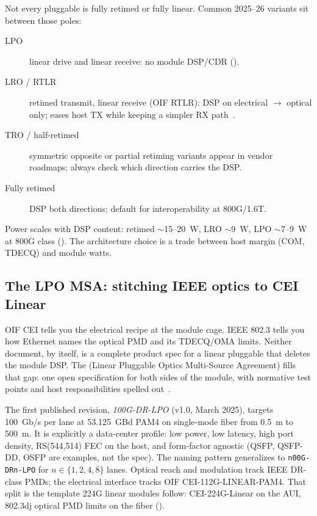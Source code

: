 Not every pluggable is fully retimed or fully linear. Common 2025--26 variants
sit between those poles:

\begin{description}
\item[LPO] linear drive and linear receive: no module DSP/CDR
      ().
\item[LRO / RTLR] retimed transmit, linear receive (OIF RTLR): DSP on electrical
      $\to$ optical only; eases host TX while keeping a simpler RX path~\cite{lpo}.
\item[TRO / half-retimed] symmetric opposite or partial retiming variants appear in
      vendor roadmaps; always check which direction carries the DSP.
\item[Fully retimed] DSP both directions; default for interoperability at 800G/1.6T.
\end{description}

Power scales with DSP content: retimed $\sim$15--20~W, LRO $\sim$9~W, LPO
$\sim$7--9~W at 800G class (). The architecture choice is a trade
between host margin (COM, TDECQ) and module watts.

\subsection{The LPO MSA: stitching IEEE optics to CEI Linear}
\label{sec:lpo-msa}

OIF CEI tells you the electrical recipe at the module cage. IEEE 802.3 tells you
how Ethernet names the optical PMD and its TDECQ/OMA limits. Neither document,
by itself, is a complete product spec for a linear pluggable that deletes the
module DSP. The  (Linear Pluggable Optics
Multi-Source Agreement) fills that gap: one open specification for both sides of
the module, with normative test points and host responsibilities spelled
out~.

The first published revision, \emph{100G-DR-LPO} (v1.0, March 2025), targets
100~Gb/s per lane at 53.125~GBd PAM4 on single-mode fiber from 0.5~m to 500~m.
It is explicitly a data-center profile: low power, low latency, high port density,
RS(544,514) FEC on the host, and form-factor agnostic (QSFP, QSFP-DD, OSFP are
examples, not the spec). The naming pattern generalizes to \texttt{n00G-DRn-LPO}
for $n\in\{1,2,4,8\}$ lanes. Optical reach and modulation track IEEE DR-class
PMDs; the electrical interface tracks OIF CEI-112G-LINEAR-PAM4. That split is the
template 224G linear modules follow: CEI-224G-Linear on the AUI, 802.3dj optical
PMD limits on the fiber ().

